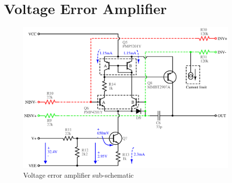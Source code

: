 \section{Voltage Error Amplifier}

\begin{figure}[H]
\centering
\includegraphics[width=5.5in]{sch/verror}
\caption{Voltage error amplifier sub-schematic}
\label{fig:verror}
\end{figure}

